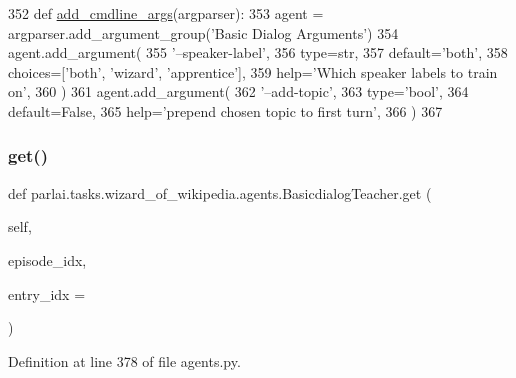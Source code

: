 \begin{DoxyCode}
352     \textcolor{keyword}{def }\hyperlink{namespaceparlai_1_1agents_1_1drqa_1_1config_a62fdd5554f1da6be0cba185271058320}{add\_cmdline\_args}(argparser):
353         agent = argparser.add\_argument\_group(\textcolor{stringliteral}{'Basic Dialog Arguments'})
354         agent.add\_argument(
355             \textcolor{stringliteral}{'--speaker-label'},
356             type=str,
357             default=\textcolor{stringliteral}{'both'},
358             choices=[\textcolor{stringliteral}{'both'}, \textcolor{stringliteral}{'wizard'}, \textcolor{stringliteral}{'apprentice'}],
359             help=\textcolor{stringliteral}{'Which speaker labels to train on'},
360         )
361         agent.add\_argument(
362             \textcolor{stringliteral}{'--add-topic'},
363             type=\textcolor{stringliteral}{'bool'},
364             default=\textcolor{keyword}{False},
365             help=\textcolor{stringliteral}{'prepend chosen topic to first turn'},
366         )
367 
\end{DoxyCode}
\mbox{\label{classparlai_1_1tasks_1_1wizard__of__wikipedia_1_1agents_1_1BasicdialogTeacher_ae457e3f6ba55bc18191d0fbcc4b408a1}} 
\subsubsection{\texorpdfstring{get()}{get()}}
{\footnotesize\ttfamily def parlai.\+tasks.\+wizard\+\_\+of\+\_\+wikipedia.\+agents.\+Basicdialog\+Teacher.\+get (\begin{DoxyParamCaption}\item[{}]{self,  }\item[{}]{episode\+\_\+idx,  }\item[{}]{entry\+\_\+idx = {} }\end{DoxyParamCaption})}



Definition at line 378 of file agents.\+py.


